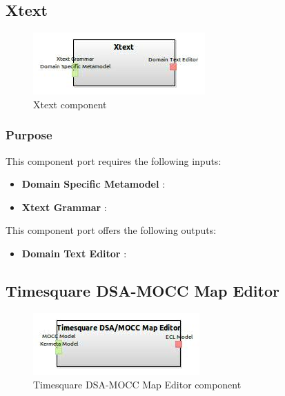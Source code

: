 \documentclass{gemoc} %
\begin{document}
\subsection{Xtext}

\begin{figure}[htp]
	\begin{center}
	\includegraphics*[trim=0.0cm 0.0cm 0cm 0.0cm, clip=true, scale=1.0]{../images/generated/Generated_Xtext.jpg}
	\caption{Xtext component}
	\end{center}
\end{figure}

\subsubsection{Purpose}

This component port requires the following inputs:
\begin{itemize}
  \item \textbf{Domain Specific Metamodel} :
  \item \textbf{Xtext Grammar} :
\end{itemize}

This component port offers the following outputs:
\begin{itemize}
  \item \textbf{Domain Text Editor} :
\end{itemize}

\subsection{Timesquare DSA-MOCC Map Editor}

\begin{figure}[htp]
	\begin{center}
	\includegraphics*[trim=0.0cm 0.0cm 0cm 0.0cm, clip=true, scale=1.0]{../images/generated/Generated_Timesquare DSA-MOCC Map Editor.jpg}
	\caption{Timesquare DSA-MOCC Map Editor component}
	\end{center}
\end{figure}
\end{document}
